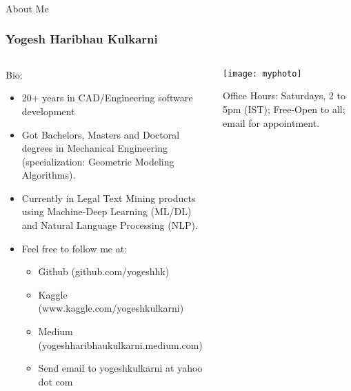 \begin{frame}[fragile]\frametitle{}
\begin{center}
{\Large About Me}
\end{center}
\end{frame}

\begin{frame}[fragile]\frametitle{Yogesh Haribhau Kulkarni}
\begin{columns}
    \begin{column}[T]{0.7\linewidth}
		Bio:
      \begin{itemize}
		\item 20+ years in CAD/Engineering software development
		\item Got Bachelors, Masters and Doctoral degrees in Mechanical Engineering (specialization: Geometric Modeling Algorithms). 
		\item Currently in Legal Text Mining products using Machine-Deep Learning (ML/DL) and Natural Language Processing (NLP).
		\item Feel free to follow me at:
      \begin{itemize}
			\item Github (github.com/yogeshhk)
			\item Kaggle (www.kaggle.com/yogeshkulkarni)
			\item Medium (yogeshharibhaukulkarni.medium.com)
			\item Send email to yogeshkulkarni at yahoo dot com
			\end{itemize}
	  \end{itemize}
    \end{column}
		
    \begin{column}[T]{0.3\linewidth}
      \centering
      \texttt{[image: myphoto]}
			
			Office Hours: Saturdays, 2 to 5pm (IST); Free-Open to all; email for appointment.
    \end{column}
		
  \end{columns}

\end{frame}



